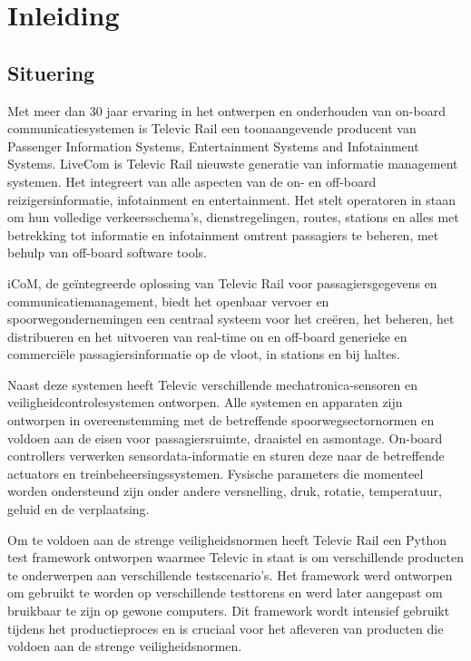 \chapter{Inleiding}\label{hfdst:situering}
\section{Situering}
Met meer dan 30 jaar ervaring in het ontwerpen en onderhouden van on-board communicatiesystemen is Televic Rail een toonaangevende producent van Passenger Information Systems, Entertainment Systems and Infotainment Systems.
LiveCom is Televic Rail nieuwste generatie van informatie management systemen.
Het integreert van alle aspecten van de on- en off-board reizigersinformatie, infotainment en entertainment. 
Het stelt operatoren in staan om hun volledige verkeersschema's, dienstregelingen, routes, stations en alles met betrekking tot informatie en infotainment omtrent passagiers te beheren, met behulp van off-board software tools.

iCoM, de geïntegreerde oplossing van Televic Rail voor passagiersgegevens en communicatiemanagement, biedt het openbaar vervoer en spoorwegondernemingen een centraal systeem voor het creëren, het beheren, het distribueren en het uitvoeren van real-time on en off-board generieke en commerciële passagiersinformatie op de vloot, in stations en bij haltes.

Naast deze systemen heeft Televic verschillende mechatronica-sensoren en veiligheidcontrolesystemen ontworpen.
Alle systemen en apparaten zijn ontworpen in overeenstemming met de betreffende spoorwegsectornormen en voldoen aan de eisen voor passagiersruimte, draaistel en asmontage. 
On-board controllers verwerken sensordata-informatie en sturen deze naar de betreffende actuators en treinbeheersingssystemen.
Fysische parameters die momenteel worden ondersteund zijn onder andere versnelling, druk, rotatie, temperatuur, geluid en de verplaatsing.

Om te voldoen aan de strenge veiligheidsnormen heeft Televic Rail een Python test framework ontworpen waarmee Televic in staat is om verschillende producten te onderwerpen aan verschillende testscenario's.
Het framework werd ontworpen om gebruikt te worden op verschillende testtorens en werd later aangepast om bruikbaar te zijn op gewone computers.
Dit framework wordt intensief gebruikt tijdens het productieproces en is cruciaal voor het afleveren van producten die voldoen aan de strenge veiligheidsnormen.

